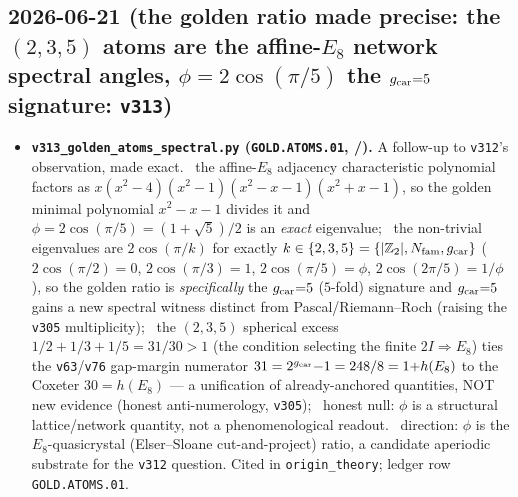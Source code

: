 \subsection*{2026-06-21 (the golden ratio made precise: the $(2,3,5)$ atoms are the affine-$E_8$ network spectral angles, $\phi=2\cos(\pi/5)$ the $g_{\mathrm{car}}{=}5$ signature: \texttt{v313})}
\begin{itemize}
\item \textbf{\texttt{v313\_golden\_atoms\_spectral.py} (\texttt{GOLD.ATOMS.01}, \mE/\mC).} A follow-up to \texttt{v312}'s
  observation, made exact. \mE\ the affine-$E_8$ adjacency characteristic polynomial factors as
  $x(x^2{-}4)(x^2{-}1)(x^2{-}x{-}1)(x^2{+}x{-}1)$, so the golden minimal polynomial $x^2{-}x{-}1$ divides it and
  $\phi=2\cos(\pi/5)=(1{+}\sqrt5)/2$ is an \emph{exact} eigenvalue; \mE\ the non-trivial eigenvalues are
  $2\cos(\pi/k)$ for exactly $k\in\{2,3,5\}=\{|\mathbb Z_2|,N_{\mathrm{fam}},g_{\mathrm{car}}\}$ ($2\cos(\pi/2){=}0$, $2\cos(\pi/3){=}1$,
  $2\cos(\pi/5){=}\phi$, $2\cos(2\pi/5){=}1/\phi$), so the golden ratio is \emph{specifically} the $g_{\mathrm{car}}{=}5$
  ($5$-fold) signature and $g_{\mathrm{car}}{=}5$ gains a new spectral witness distinct from Pascal/Riemann--Roch (raising the
  \texttt{v305} multiplicity); \mE\ the $(2,3,5)$ spherical excess $1/2{+}1/3{+}1/5=31/30>1$ (the condition selecting
  the finite $2I\Rightarrow E_8$) ties the \texttt{v63}/\texttt{v76} gap-margin numerator $31=2^{g_{\mathrm{car}}}{-}1=248/8=1{+}h(E_8)$
  to the Coxeter $30=h(E_8)$ --- a unification of already-anchored quantities, NOT new evidence (honest
  anti-numerology, \texttt{v305}); \mE\ honest null: $\phi$ is a structural lattice/network quantity, not a
  phenomenological readout. \mC\ direction: $\phi$ is the $E_8$-quasicrystal (Elser--Sloane cut-and-project) ratio,
  a candidate aperiodic substrate for the \texttt{v312} question. Cited in \texttt{origin\_theory}; ledger row
  \texttt{GOLD.ATOMS.01}.
\end{itemize}

